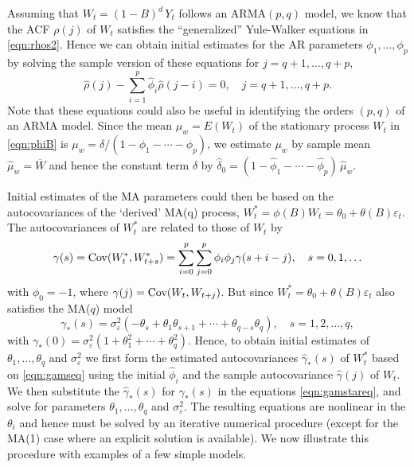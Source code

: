 Assuming that $W_t= (1 - B)^d\, Y_t$ follows an ARMA$(p,q)$ model, we know that the ACF $\rho(j)$ of $W_t$ satisfies the ``generalized'' Yule-Walker equations in \eqref{eqn:rhos2}. Hence we can obtain initial estimates for the AR parameters $\phi_1, \ldots, \phi_p$ by solving the sample version of these equations for $j= q+1,\ldots, q+p$,
	\begin{equation} \label{eqn:rhohatsum}
	\hat{\rho}(j) - \sum_{i=1}^p \hat{\phi}_i \hat{\rho}(j-i) = 0, \quad j= q+1, \ldots, q+p.
	\end{equation}
Note that these equations could also be useful in identifying the orders $(p,q)$ of an ARMA model. Since the mean $\mu_w = E(W_t)$ of the stationary process $W_t$ in \eqref{eqn:phiB} is $\mu_w = \delta/(1 - \phi_1 - \cdots - \phi_p)$, we estimate $\mu_w$ by sample mean $\hat{\mu}_w = \overline{W}$ and hence the constant term $\delta$ by $\hat{\delta}_0 = (1 - \hat{\phi}_1 - \cdots - \hat{\phi}_p)\, \hat{\mu}_w$.


Initial estimates of the MA parameters could then be based on the autocovariances of the `derived' MA(q) process, $W_t^* = \phi(B) W_t = \theta_0 + \theta(B) \varepsilon_t$. The autocovariances of $W_t^*$ are related to those of $W_t$ by
	\begin{equation} \label{eqn:gamseq}
	\gamma(s) = \cov(W_t^*, W_{t+s}^*) = \sum_{i=0}^p \sum_{j=0}^p \phi_i \phi_j \gamma(s+i-j), \quad s = 0,1,\ldots
	\end{equation}
with $\phi_0 = -1$, where $\gamma(j) = \operatorname{Cov}(W_t, W_{t+j})$. But since $W_t^* = \theta_0 + \theta(B)\varepsilon_t$ also satisfies the MA($q$) model
	\begin{equation} \label{eqn:gamstareq}
	\gamma_*(s) = \sigma_{\varepsilon}^2 (-\theta_s + \theta_1 \theta_{s+1} + \cdots + \theta_{q-s}\theta_q), \quad s = 1,2,\ldots,q,
	\end{equation}
with $\gamma_*(0) = \sigma_{\varepsilon}^2 (1 + \theta_1^2 + \cdots + \theta_q^2)$. Hence, to obtain initial estimates of $\theta_1, \ldots, \theta_q$ and $\sigma_{\varepsilon}^2$ we first form the estimated autocovariances $\hat{\gamma}_*(s)$ of $W_t^*$ based on \eqref{eqn:gamseq} using the initial $\hat{\phi}_{i}$ and the sample autocovariance $\hat{\gamma}(j)$ of $W_t$. We then substitute the $\hat{\gamma}_*(s)$ for $\gamma_*(s)$ in the equations \eqref{eqn:gamstareq}, and solve for parameters $\theta_1, \ldots, \theta_q$ and $\sigma_{\varepsilon}^2$. The resulting equations are nonlinear in the $\theta_i$ and hence must be solved by an iterative numerical procedure (except for the MA(1) case where an explicit solution is available). We now illustrate this procedure with examples of a few simple models. 


